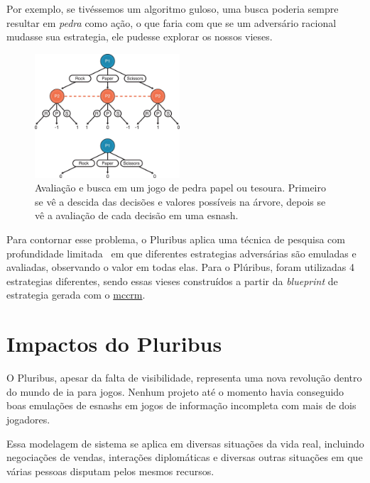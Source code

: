 \documentclass[twocolumn]{article}
\theoremstyle{mytheoremstyle}
\theoremstyle{mytheoremstyle}
\theoremstyle{myproblemstyle}
\begin{document}
        Por exemplo, se tivéssemos um algoritmo guloso, uma busca poderia sempre resultar em \emph{pedra}
        como ação, o que faria com que se um adversário racional mudasse sua \gls{estrategia}, ele pudesse explorar os nossos vieses.


        \begin{figure}
            \includegraphics[width=0.48\textwidth]{./rps.jpeg}
            \caption{Avaliação e busca em um jogo de pedra papel ou tesoura. Primeiro se vê a descida das decisões e valores possíveis
            na árvore, depois se vê a avaliação de cada decisão em uma \gls{esnash}.}
            \label{fig:rps}
        \end{figure}

        Para contornar esse problema, o Pluribus aplica uma técnica de pesquisa com profundidade limitada~\cite{brown2018depth} em que diferentes \glspl{estrategia}
        adversárias são emuladas e avaliadas, observando o valor em todas elas. Para o Plúribus, foram utilizadas 4 \glspl{estrategia} diferentes, sendo essas
        vieses construídos a partir da \emph{blueprint} de \gls{estrategia} gerada com o \hyperref[sec:Minização de arrependimento contrafactual de Monte Carlo]{\acrshort{mccrm}}.


    \section{Impactos do Pluribus} %
    \label{sec:Impactos do Pluribus}

    O Pluribus, apesar da falta de visibilidade, representa uma nova revolução dentro do mundo de
    \acrlong{ia} para jogos. Nenhum projeto até o momento havia conseguido boas emulações de
    \glspl{esnash} em jogos de informação incompleta com mais de dois jogadores.

    Essa modelagem de sistema se aplica em diversas situações da vida real, incluindo negociações de vendas,
    interações diplomáticas e diversas outras situações em que várias pessoas disputam pelos mesmos
    recursos.
\end{document}
